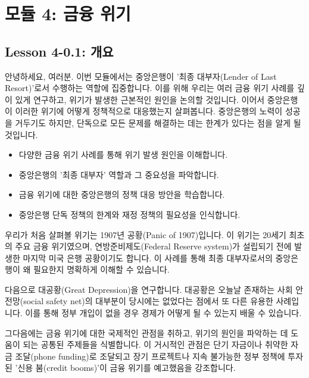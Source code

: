 \documentclass[11pt,a4paper]{article}
\begin{document}
\newpage

\section{모듈 4: 금융 위기}

\subsection{Lesson 4-0.1: 개요}
안녕하세요, 여러분. 이번 모듈에서는 중앙은행이 '최종 대부자(Lender of Last Resort)'로서 수행하는 역할에 집중합니다. 이를 위해 우리는 여러 금융 위기 사례를 깊이 있게 연구하고, 위기가 발생한 근본적인 원인을 논의할 것입니다. 이어서 중앙은행이 이러한 위기에 어떻게 정책적으로 대응했는지 살펴봅니다. 중앙은행의 노력이 성공을 거두기도 하지만, 단독으로 모든 문제를 해결하는 데는 한계가 있다는 점을 알게 될 것입니다.

\begin{tcolorbox}[title=\textbf{모듈 4 학습 목표}]
\begin{itemize}
    \item 다양한 금융 위기 사례를 통해 위기 발생 원인을 이해합니다.
    \item 중앙은행의 '최종 대부자' 역할과 그 중요성을 파악합니다.
    \item 금융 위기에 대한 중앙은행의 정책 대응 방안을 학습합니다.
    \item 중앙은행 단독 정책의 한계와 재정 정책의 필요성을 인식합니다.
\end{itemize}
\end{tcolorbox}

우리가 처음 살펴볼 위기는 1907년 공황(Panic of 1907)입니다. 이 위기는 20세기 최초의 주요 금융 위기였으며, 연방준비제도(Federal Reserve system)가 설립되기 전에 발생한 마지막 미국 은행 공황이기도 합니다. 이 사례를 통해 최종 대부자로서의 중앙은행이 왜 필요한지 명확하게 이해할 수 있습니다.

다음으로 대공황(Great Depression)을 연구합니다. 대공황은 오늘날 존재하는 사회 안전망(social safety net)의 대부분이 당시에는 없었다는 점에서 또 다른 유용한 사례입니다. 이를 통해 정부 개입이 없을 경우 경제가 어떻게 될 수 있는지 배울 수 있습니다.

그다음에는 금융 위기에 대한 국제적인 관점을 취하고, 위기의 원인을 파악하는 데 도움이 되는 공통된 주제들을 식별합니다. 이 거시적인 관점은 단기 자금이나 취약한 자금 조달(phone funding)로 조달되고 장기 프로젝트나 지속 불가능한 정부 정책에 투자된 '신용 붐(credit booms)'이 금융 위기를 예고했음을 강조합니다.
\end{document}
